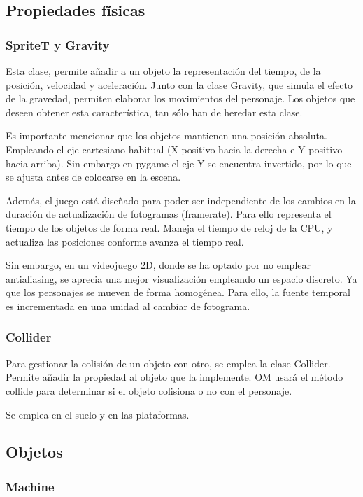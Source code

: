 \documentclass[11pt,a4paper]{article}
\begin{document}
\subsection{Propiedades físicas}

\subsubsection{SpriteT y Gravity}

Esta clase, permite añadir a un objeto la representación del tiempo, de la 
posición, velocidad y aceleración. Junto con la clase Gravity, que simula el 
efecto de la gravedad, permiten elaborar los movimientos del personaje. Los 
objetos que deseen obtener esta característica, tan sólo han de heredar esta 
clase.

Es importante mencionar que los objetos mantienen una posición absoluta.  
Empleando el eje cartesiano habitual (X positivo hacia la derecha e Y positivo 
hacia arriba). Sin embargo en pygame el eje Y se encuentra invertido, por lo que 
se ajusta antes de colocarse en la escena.

Además, el juego está diseñado para poder ser independiente de los cambios en la 
duración de actualización de fotogramas (framerate). Para ello representa el 
tiempo de los objetos de forma real. Maneja el tiempo de reloj de la CPU, y 
actualiza las posiciones conforme avanza el tiempo real.

Sin embargo, en un videojuego 2D, donde se ha optado por no emplear 
antialiasing, se aprecia una mejor visualización empleando un espacio discreto.  
Ya que los personajes se mueven de forma homogénea. Para ello, la fuente 
temporal es incrementada en una unidad al cambiar de fotograma.

\subsubsection{Collider}
Para gestionar la colisión de un objeto con otro, se emplea la clase Collider.  
Permite añadir la propiedad al objeto que la implemente. OM usará el método 
collide para determinar si el objeto colisiona o no con el personaje.

Se emplea en el suelo y en las plataformas.

\subsection{Objetos}

\subsubsection{Machine}
\end{document}
